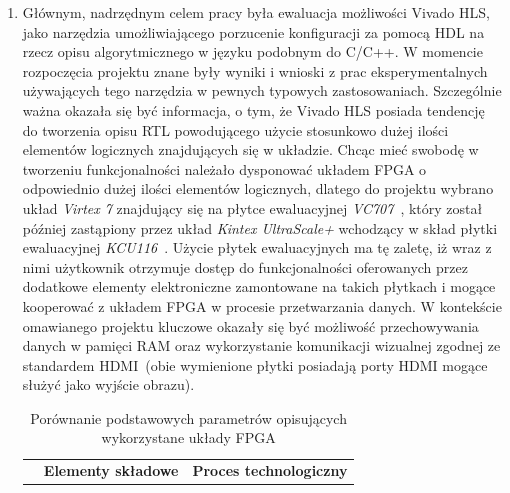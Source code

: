 \begin{enumerate}
\item Głównym, nadrzędnym celem pracy była ewaluacja możliwości Vivado HLS, jako narzędzia umożliwiającego porzucenie konfiguracji za pomocą HDL na rzecz opisu algorytmicznego w języku podobnym do C/C++. W momencie rozpoczęcia projektu znane były wyniki i wnioski z prac eksperymentalnych używających tego narzędzia w pewnych typowych zastosowaniach. Szczególnie ważna okazała się być informacja, o tym, że Vivado HLS posiada tendencję do tworzenia opisu RTL powodującego użycie stosunkowo dużej ilości elementów logicznych znajdujących się w układzie. Chcąc mieć swobodę w tworzeniu funkcjonalności należało dysponować układem FPGA o odpowiednio dużej ilości elementów logicznych, dlatego do projektu wybrano układ \textit{Virtex 7} znajdujący się na płytce ewaluacyjnej \textit{VC707}~\cite{VC707_UG}, który został później zastąpiony przez układ \textit{Kintex UltraScale+} wchodzący w skład płytki ewaluacyjnej \textit{KCU116}~\cite{KCU116_UG}. 
Użycie płytek ewaluacyjnych ma tę zaletę, iż wraz z nimi użytkownik otrzymuje dostęp do funkcjonalności oferowanych przez dodatkowe elementy elektroniczne zamontowane na takich płytkach i mogące kooperować z układem FPGA w procesie przetwarzania danych. W kontekście omawianego projektu kluczowe okazały się być możliwość przechowywania danych w pamięci RAM oraz wykorzystanie komunikacji wizualnej zgodnej ze standardem HDMI~(obie wymienione płytki posiadają porty HDMI mogące służyć jako wyjście obrazu).
\begin{savenotes}
\begin{table}[H]
\centering
\caption{Porównanie podstawowych parametrów opisujących wykorzystane układy FPGA}
\label{ch3:tab:fpga_comp}
\begin{tabular}{|r|c|c|c|c|c|}
\hline
\multirow{2}{*}{} & \multicolumn{4}{c|}{\textbf{Elementy składowe}} & \multirow{2}{*}{\textbf{Proces technologiczny}} \\ \cline{2-5}

\end{tabular}
\end{table}
\end{savenotes}
\end{enumerate}

